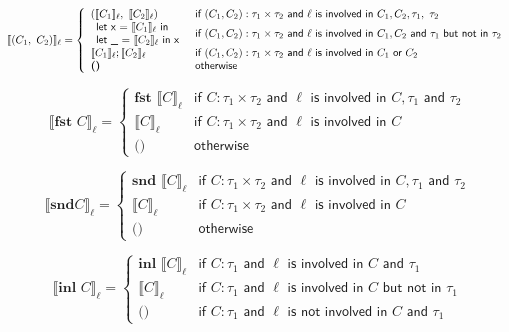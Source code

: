 \documentclass{article}
\begin{document}
$$
 \llbracket     (C_1, \ C_2) \rrbracket _\ell = \left\{
    \begin{array}{l l}
    (\llbracket     C_1 \rrbracket _\ell ,\  \llbracket     C_2 \rrbracket _\ell)  & 
    \textsf{if } (C_1, C_2) : \tau_1 \times \tau_2 \textsf{ and } \ell \textsf{ is involved in } C_1,  C_2, \tau_1, \ \tau_2 \\
    \begin{array}{l}
    \textsf{let x = } \llbracket C_1 \rrbracket _\ell \textsf{ in} \\
    \textsf{let \_ = } \llbracket C_2 \rrbracket _\ell \textsf{ in x}
    \end{array} & \textsf{if } (C_1, C_2) : \tau_1 \times \tau_2 \textsf{ and } \ell \textsf{ is involved in } C_1, C_2 \textsf{ and } \tau_1 \textsf{ but not in } \tau_2  \\
    \llbracket     C_1 \rrbracket _\ell; \llbracket     C_2 \rrbracket _\ell & \textsf{if } (C_1, C_2) : \tau_1 \times \tau_2 \textsf{ and } \ell \textsf{ is involved in }  C_1 \textsf{ or }  C_2 \\ 
    \textbf{()} & \textsf{otherwise}
    \end{array}
\right.
$$

$$
 \llbracket  \textbf{fst } C \rrbracket _\ell = \left\{
    \begin{array}{ll}
    \textbf{fst }\llbracket     C \rrbracket _\ell & \textsf{if } C : \tau_1 \times \tau_2 \textsf{ and } \ell \textsf{ is involved in } C,  \tau_1 \textsf{ and } \tau_2\\
    \llbracket C \rrbracket _\ell & \textsf{if } C : \tau_1 \times \tau_2 \textsf{ and } \ell \textsf{ is involved in } C  \\
    \textbf{()} & \textsf{otherwise}
    \end{array}
\right.
$$

$$
 \llbracket  \textbf{snd} C \rrbracket _\ell = \left\{
    \begin{array}{ll}
    \textbf{snd }\llbracket     C \rrbracket _\ell & \textsf{if } C : \tau_1 \times \tau_2 \textsf{ and } \ell \textsf{ is involved in } C,  \tau_1 \textsf{ and } \tau_2\\
    \llbracket C \rrbracket _\ell & \textsf{if } C : \tau_1 \times \tau_2 \textsf{ and } \ell \textsf{ is involved in } C  \\
    \textbf{()} & \textsf{otherwise}
    \end{array}
\right.
$$

$$
 \llbracket  \textbf{inl } C \rrbracket _\ell = \left\{
    \begin{array}{ll}
    \textbf{inl }\llbracket     C \rrbracket _\ell & \textsf{if } C : \tau_1 \textsf{ and } \ell \textsf{ is involved in } C \textsf{ and } \tau_1 \\
    \llbracket     C \rrbracket _\ell & \textsf{if } C : \tau_1 \textsf{ and } \ell \textsf{ is involved in } C \textsf{ but not in } \tau_1 \\
    \textbf{()} & \textsf{if } C : \tau_1 \textsf{ and } \ell \textsf{ is not involved in } C \textsf{ and } \tau_1
    \end{array}
\right.
$$
\end{document}
